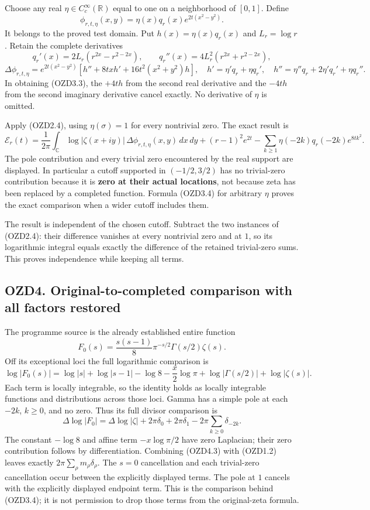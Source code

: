 Choose any real \(\eta\in C_c^\infty(\mathbb R)\) equal to one on a
neighborhood of \([0,1]\). Define \[
\phi_{r,t,\eta}(x,y)=\eta(x)q_r(x)e^{2t(x^2-y^2)}.
\tag{OZD3.1}
\] It belongs to the proved test domain. Put \(h(x)=\eta(x)q_r(x)\) and
\(L_r=\log r\). Retain the complete derivatives \[
q_r'(x)=2L_r(r^{2x}-r^{2-2x}),\qquad
q_r''(x)=4L_r^2(r^{2x}+r^{2-2x}),
\tag{OZD3.2}
\] \[
\Delta\phi_{r,t,\eta}
=e^{2t(x^2-y^2)}\left[h''+8txh'+16t^2(x^2+y^2)h\right],
\quad h'=\eta'q_r+\eta q_r',\quad
h''=\eta''q_r+2\eta'q_r'+\eta q_r''.
\tag{OZD3.3}
\] In obtaining (OZD3.3), the \(+4th\) from the second real derivative
and the \(-4th\) from the second imaginary derivative cancel exactly. No
derivative of \(\eta\) is omitted.

Apply (OZD2.4), using \(\eta(\sigma)=1\) for every nontrivial zero. The
exact result is \[
\boxed{\mathcal E_r(t)=\frac1{2\pi}\int_{\mathbb C}
\log|\zeta(x+iy)|\,\Delta\phi_{r,t,\eta}(x,y)\,dx\,dy
+(r-1)^2e^{2t}
-\sum_{k\ge1}\eta(-2k)q_r(-2k)e^{8tk^2}.}
\tag{OZD3.4}
\] The pole contribution and every trivial zero encountered by the real
support are displayed. In particular a cutoff supported in
\((-1/2,3/2)\) has no trivial-zero contribution because it is
\textbf{zero at their actual locations}, not because zeta has been
replaced by a completed function. Formula (OZD3.4) for arbitrary
\(\eta\) proves the exact comparison when a wider cutoff includes them.

The result is independent of the chosen cutoff. Subtract the two
instances of (OZD2.4): their difference vanishes at every nontrivial
zero and at \(1\), so its logarithmic integral equals exactly the
difference of the retained trivial-zero sums. This proves independence
while keeping all terms.

\subsection{OZD4. Original-to-completed comparison with all factors
restored}\label{ozd4.-original-to-completed-comparison-with-all-factors-restored}

The programme source is the already established entire function \[
F_0(s)=\frac{s(s-1)}8\pi^{-s/2}\Gamma(s/2)\zeta(s).
\tag{OZD4.1}
\] Off its exceptional loci the full logarithmic comparison is \[
\log|F_0(s)|=\log|s|+\log|s-1|-\log8
-\frac{x}{2}\log\pi+\log|\Gamma(s/2)|+\log|\zeta(s)|.
\tag{OZD4.2}
\] Each term is locally integrable, so the identity holds as locally
integrable functions and distributions across those loci. Gamma has a
simple pole at each \(-2k\), \(k\ge0\), and no zero. Thus its full
divisor comparison is \[
\Delta\log|F_0|=\Delta\log|\zeta|
+2\pi\delta_0+2\pi\delta_1
-2\pi\sum_{k\ge0}\delta_{-2k}.
\tag{OZD4.3}
\] The constant \(-\log8\) and affine term \(-x\log\pi/2\) have zero
Laplacian; their zero contribution follows by differentiation. Combining
(OZD4.3) with (OZD1.2) leaves exactly
\(2\pi\sum_\rho m_\rho\delta_\rho\). The \(s=0\) cancellation and each
trivial-zero cancellation occur between the explicitly displayed terms.
The pole at \(1\) cancels with the explicitly displayed endpoint term.
This is the comparison behind (OZD3.4); it is not permission to drop
those terms from the original-zeta formula.

